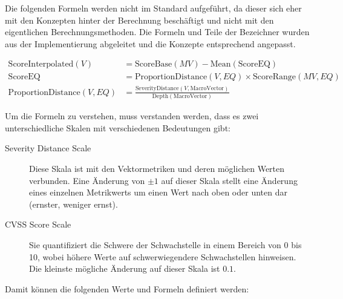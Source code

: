 Die folgenden Formeln werden nicht im Standard aufgeführt, da dieser sich eher mit den Konzepten hinter der Berechnung beschäftigt und nicht mit den eigentlichen Berechnungsmethoden.
Die Formeln und Teile der Bezeichner wurden aus der Implementierung abgeleitet und die Konzepte entsprechend angepasst.

\begin{align*}
    \text{ScoreInterpolated}(V) &= \text{ScoreBase}(MV) - \text{Mean}(\text{ScoreEQ}) \\
    \text{ScoreEQ} &= \text{ProportionDistance}(V, EQ) \times \text{ScoreRange}(MV, EQ) \\
    \text{ProportionDistance}(V, EQ) &= \frac{\text{SeverityDistance}(V, \text{MacroVector})}{\text{Depth}(\text{MacroVector})}
\end{align*}

Um die Formeln zu verstehen, muss verstanden werden, dass es zwei unterschiedliche Skalen mit verschiedenen Bedeutungen gibt:

\begin{description}
    \item[Severity Distance Scale] Diese Skala ist mit den Vektormetriken und deren möglichen Werten verbunden.
    Eine Änderung von $\pm 1$ auf dieser Skala stellt eine Änderung eines einzelnen Metrikwerts um einen Wert nach oben oder unten dar (ernster, weniger ernst).
    \item[CVSS Score Scale] Sie quantifiziert die Schwere der Schwachstelle in einem Bereich von 0 bis 10, wobei höhere Werte auf schwerwiegendere Schwachstellen hinweisen.
    Die kleinste mögliche Änderung auf dieser Skala ist $0.1$.
\end{description}

Damit können die folgenden Werte und Formeln definiert werden:

